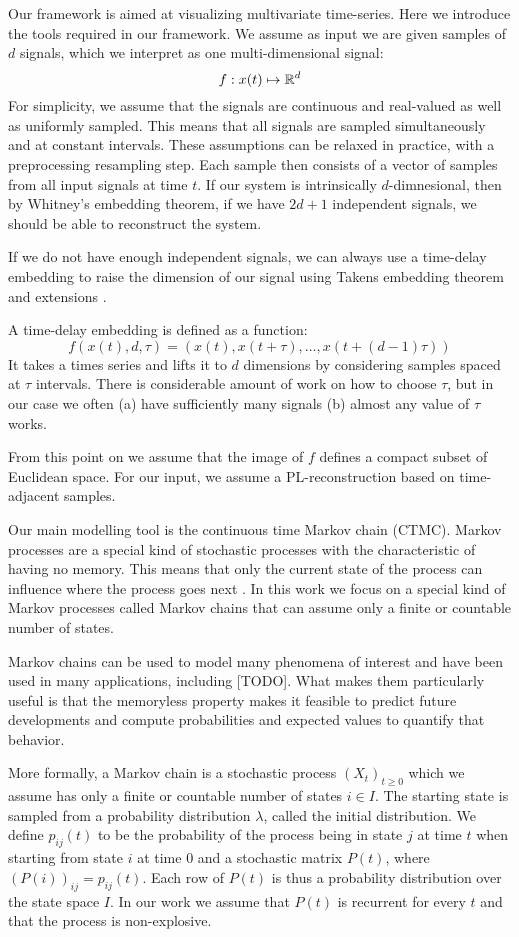 \label{sec:preliminaries}
Our framework is aimed at visualizing multivariate time-series. Here we introduce the tools required in our framework. We assume as input we are given samples of $d$ signals, which we interpret as one multi-dimensional signal:
$$f: x(t)\mapsto \mathbb{R}^d$$
For simplicity, we assume that the signals are continuous and real-valued as well as uniformly sampled. This means that all signals are sampled simultaneously and at constant intervals. These assumptions can be relaxed in practice, with a preprocessing resampling step.  Each sample then consists of a vector of samples from all input signals at time $t$. If our system is intrinsically $d$-dimnesional, then by Whitney's embedding theorem, if we have $2d+1$ independent signals, we should be able to reconstruct the system.

If we do not have enough independent signals, we can always use a time-delay embedding to raise the dimension of our signal using Takens embedding theorem \cite{} and extensions \cite{}.  

A time-delay embedding is defined as a function:
$$ f(x(t),d,\tau) = (x(t),x(t+\tau),\ldots,x(t+(d-1)\tau) )$$
It takes a times series and lifts it to $d$ dimensions by considering samples spaced at $\tau$ intervals. There is considerable amount of work on how to choose $\tau$, but in our case we often (a) have sufficiently many signals (b) almost any value of $\tau$ works. 

From this point on we  assume that the image of $f$ defines a compact subset of Euclidean space. For our input, we assume a PL-reconstruction based on time-adjacent samples. 

Our main modelling tool is the continuous time Markov chain (CTMC). Markov processes are a special kind of stochastic processes with the characteristic of  	having no memory. This means that only the current state of the process can influence	where the process goes next \cite{norris1998markov}. In this work we focus on a special kind
	of Markov processes called Markov chains that can assume only a finite or countable
	number of states.

Markov chains can be used to model many phenomena of interest and have been used in many
	applications, including [TODO]. What makes them particularly useful is that the memoryless
	property makes it feasible to predict future developments and compute probabilities and
	expected values to quantify that behavior.
	
	More formally, a Markov chain is a stochastic process $(X_t)_{t \ge 0}$ which we assume has 
	only a finite or countable number of states $i \in I$. The starting state
	is sampled from a probability distribution $\lambda$, called the initial distribution.
	We define $p_{ij}(t)$ to be the probability of the process being in state $j$ at time $t$
	when starting from state $i$ at time $0$ and a stochastic matrix $P(t)$, where $\left(P(i)\right)_{ij} = p_{ij}(t)$.
	Each row of $P(t)$ is thus a probability distribution over the state space $I$. In our
	work we assume that $P(t)$ is recurrent for every $t$ and that the process is non-explosive.
	
